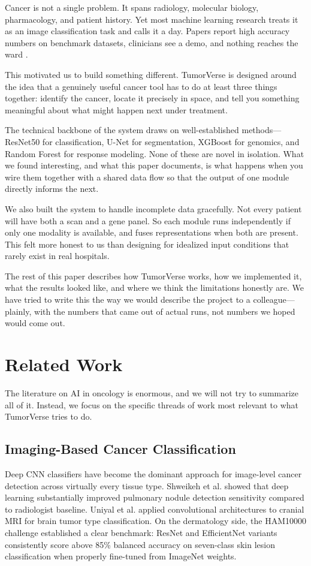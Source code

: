\documentclass[conference]{IEEEtran}
\begin{document}
Cancer is not a single problem. It spans radiology, molecular biology, pharmacology, and patient history. Yet most machine learning research treats it as an image classification task and calls it a day. Papers report high accuracy numbers on benchmark datasets, clinicians see a demo, and nothing reaches the ward \cite{esteva2024, varoquaux2018}.

This motivated us to build something different. TumorVerse is designed around the idea that a genuinely useful cancer tool has to do at least three things together: identify the cancer, locate it precisely in space, and tell you something meaningful about what might happen next under treatment.

The technical backbone of the system draws on well-established methods—ResNet50 for classification, U-Net for segmentation, XGBoost for genomics, and Random Forest for response modeling. None of these are novel in isolation. What we found interesting, and what this paper documents, is what happens when you wire them together with a shared data flow so that the output of one module directly informs the next.

We also built the system to handle incomplete data gracefully. Not every patient will have both a scan and a gene panel. So each module runs independently if only one modality is available, and fuses representations when both are present. This felt more honest to us than designing for idealized input conditions that rarely exist in real hospitals.

The rest of this paper describes how TumorVerse works, how we implemented it, what the results looked like, and where we think the limitations honestly are. We have tried to write this the way we would describe the project to a colleague—plainly, with the numbers that came out of actual runs, not numbers we hoped would come out.

\section{Related Work}

The literature on AI in oncology is enormous, and we will not try to summarize all of it. Instead, we focus on the specific threads of work most relevant to what TumorVerse tries to do.

\subsection{Imaging-Based Cancer Classification}
Deep CNN classifiers have become the dominant approach for image-level cancer detection across virtually every tissue type. Shweikeh et al. \cite{shweikeh2026} showed that deep learning substantially improved pulmonary nodule detection sensitivity compared to radiologist baseline. Uniyal et al. \cite{uniyal2026} applied convolutional architectures to cranial MRI for brain tumor type classification. On the dermatology side, the HAM10000 challenge \cite{ham10000} established a clear benchmark: ResNet and EfficientNet variants consistently score above 85\% balanced accuracy on seven-class skin lesion classification when properly fine-tuned from ImageNet weights.
\end{document}
